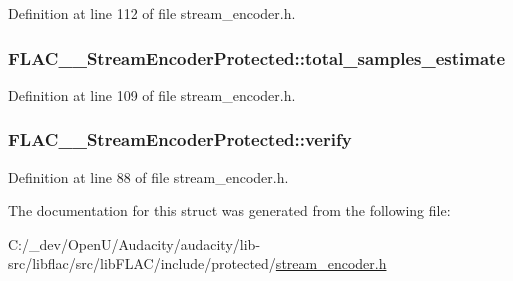 Definition at line 112 of file stream\+\_\+encoder.\+h.

\subsubsection[{\texorpdfstring{total\+\_\+samples\+\_\+estimate}{total_samples_estimate}}]{ F\+L\+A\+C\+\_\+\+\_\+\+Stream\+Encoder\+Protected\+::total\+\_\+samples\+\_\+estimate}\hypertarget{struct_f_l_a_c_____stream_encoder_protected_a892d324d6fe117ad7361c3ef71698d84}{}\label{struct_f_l_a_c_____stream_encoder_protected_a892d324d6fe117ad7361c3ef71698d84}


Definition at line 109 of file stream\+\_\+encoder.\+h.

\subsubsection[{\texorpdfstring{verify}{verify}}]{ F\+L\+A\+C\+\_\+\+\_\+\+Stream\+Encoder\+Protected\+::verify}\hypertarget{struct_f_l_a_c_____stream_encoder_protected_a5124181d867109988d7c2c1285e1ee45}{}\label{struct_f_l_a_c_____stream_encoder_protected_a5124181d867109988d7c2c1285e1ee45}


Definition at line 88 of file stream\+\_\+encoder.\+h.



The documentation for this struct was generated from the following file\+:\begin{DoxyCompactItemize}
\item 
C\+:/\+\_\+dev/\+Open\+U/\+Audacity/audacity/lib-\/src/libflac/src/lib\+F\+L\+A\+C/include/protected/\hyperlink{src_2lib_f_l_a_c_2include_2protected_2stream__encoder_8h}{stream\+\_\+encoder.\+h}\end{DoxyCompactItemize}
